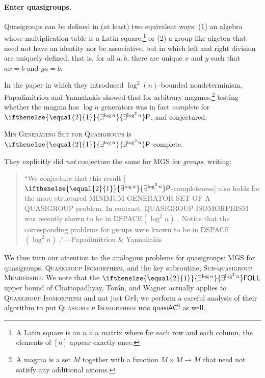 \documentclass{article}
\newcommand{\algprobm}[1]{\textsc{#1}\xspace}
\newcommand{\betacc}[1]{\ifthenelse{\equal{#1}{1}}{\exists^{\log n}}{\exists^{\log^{#1}n}}} %
\newcommand*{\ComplexityClass}[1]{\ensuremath{\mathsf{#1}}\xspace}
\renewcommand{\P}{\ComplexityClass{P}}
\newcommand{\qACz}{\ComplexityClass{quasiAC^0}}
\newcommand{\FOLL}{\ComplexityClass{FOLL}}
\begin{document}
\paragraph{Enter quasigroups.} Quasigroups can be defined in (at least) two equivalent ways: (1) an algebra whose multiplication table is a Latin square,\footnote{A Latin square is an $n \times n$ matrix where for each row and each column, the elements of $[n]$ appear exactly once.} or (2) a group-like algebra that need not have an identity nor be associative, but in which left and right division are uniquely defined, that is, for all $a,b$, there are unique $x$ and $y$ such that $ax=b$ and $ya=b$. 

In the paper in which they introduced $\log^2(n)$-bounded nondeterminism, Papadimitriou and Yannakakis showed that for arbitrary magmas,\footnote{A magma is a set $M$ together with a function $M \times M \to M$ that need not satisfy any additional axioms.} testing whether the magma has $\log n$ generators was in fact \emph{complete} for $\betacc{2} \P$, and conjectured:

\begin{conjecture} \label{conj:PY}
\algprobm{Min Generating Set for Quasigroups} is $\betacc{2}\P$-complete.
\end{conjecture}

\noindent They explicitly did \emph{not} conjecture the same for \algprobm{MGS} for \emph{groups}, writing:

\begin{quotation}
\noindent ``We conjecture that this result [$\betacc{2}\P$-completeness] also holds for the more structured MINIMUM GENERATOR SET OF A QUASIGROUP problem. In contrast, QUASIGROUP ISOMORPHISM was recently shown to be in DSPACE$(\log^2 n)$ \cite{Wolf}. Notice that the corresponding problems for groups were known to be in DSPACE$(\log^2 n)$ \cite{LiptonSnyderZalcstein}.''---Papadimitriou \& Yannakakis \cite[p.~169]{PY}
\end{quotation}

\noindent We thus turn our attention to the analogous problems for quasigroups: \algprobm{MGS} for quasigroups, \algprobm{Quasigroup Isomorphism}, and the key subroutine, \algprobm{Sub-quasigroup Membership}. We note that the $\betacc{2}\FOLL$ upper bound of Chattopadhyay, Torán, and Wagner \cite{ChattopadhyayToranWagner} actually applies to \algprobm{Quasigroup Isomorphism} and not just \algprobm{GpI}; we perform a careful analysis of their algorithm to put \algprobm{Quasigroup Isomorphism} into $\qACz$ as well. 
\end{document}
